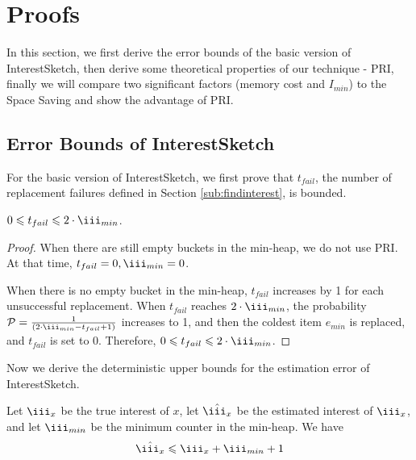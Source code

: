 \presec
\section{Proofs} \postsec
\label{sec:proof}

In this section, we first derive the error bounds of the basic version of InterestSketch, then derive some theoretical properties of our technique - PRI, {\color{reviewC}finally we will compare two significant factors (memory cost and $I_{min}$) to the Space Saving and show the advantage of PRI.}


\presub
\subsection{Error Bounds of InterestSketch}
\postsub

For the basic version of InterestSketch, we first prove that $t_{fail}$, the number of replacement failures defined in Section \ref{sub:findinterest}, is bounded.

\begin{theorem}
	\label{theo:zero}
	$0 \leqslant t_{fail} \leqslant 2\cdot\iii_{min}$.
\end{theorem}

\begin{proof}
When there are still empty buckets in the min-heap, we do not use PRI. At that time, $t_{fail} = 0, \iii_{min} = 0$.

When there is no empty bucket in the min-heap, $t_{fail}$ increases by 1 for each unsuccessful replacement. When $t_{fail}$ reaches $2\cdot\iii_{min}$, the probability $\mathcal{P} = \frac{1}{(2\cdot\iii_{min}-t_{fail}+1)}$ increases to 1, and then the coldest item $e_{min}$ is replaced, and $t_{fail}$ is set to 0.
Therefore,
$0 \leqslant t_{fail} \leqslant 2\cdot\iii_{min}$.

\end{proof}

Now we derive the deterministic upper bounds for the estimation error of InterestSketch.

\begin{theorem}
	\label{theo:first}
	Let $\iii_x$ be the true interest of $x$, let $\hat{\iii_x}$ be the estimated interest of $\iii_x$, and let $\iii_{min}$ be the minimum counter in the min-heap. We have
	\begin{equation}
	\begin{aligned}
    \centering
    \hat{\iii_x} \leqslant \iii_x + \iii_{min} + 1
	\end{aligned}
	\end{equation}
\end{theorem}


